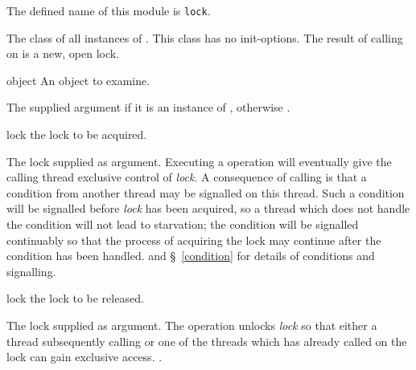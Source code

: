 \begin{optDefinition}
\label{lock}
\gdef\module{lock}
The defined name of this module is {\tt lock}.

%
The class of all instances of .  This class has no
init-options.  The result of calling  on 
is a new, open lock.

%
\begin{arguments}
    \item[object] An object to examine.
\end{arguments}
%
\result%
The supplied argument if it is an instance of ,
otherwise \nil{}.

%
\begin{arguments}
    \item[lock] the lock to be acquired.
\end{arguments}
%
\result%
The lock supplied as argument.
%
\remarks%
Executing a  operation will eventually give the calling thread
exclusive control of {\em lock}.  A consequence of calling  is
that a condition from another thread may be signalled on this thread.  Such a
condition will be signalled before {\em lock} has been acquired, so a thread
which does not handle the condition will not lead to starvation; the condition
will be signalled continuably so that the process of acquiring the lock may
continue after the condition has been handled.
%
\seealso%
 and \S~\ref{condition} for details of conditions and
signalling.

%
\begin{arguments}
    \item[lock] the lock to be released.
\end{arguments}
%
\result%
The lock supplied as argument.
%
\remarks%
The  operation unlocks {\em lock} so that either a thread
subsequently calling  or one of the threads which has already
called  on the lock can gain exclusive access.
%
\seealso%
.
%
\end{optDefinition}
